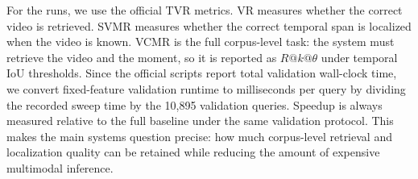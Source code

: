 For the \xml runs, we use the official TVR metrics. VR measures whether the correct video is retrieved. SVMR measures whether the correct temporal span is localized when the video is known. VCMR is the full corpus-level task: the system must retrieve the video and the moment, so it is reported as $R@k@\theta$ under temporal IoU thresholds. Since the official scripts report total validation wall-clock time, we convert fixed-feature validation runtime to milliseconds per query by dividing the recorded sweep time by the 10{,}895 validation queries. Speedup is always measured relative to the full \xml baseline under the same validation protocol. This makes the main systems question precise: how much corpus-level retrieval and localization quality can be retained while reducing the amount of expensive multimodal inference.
